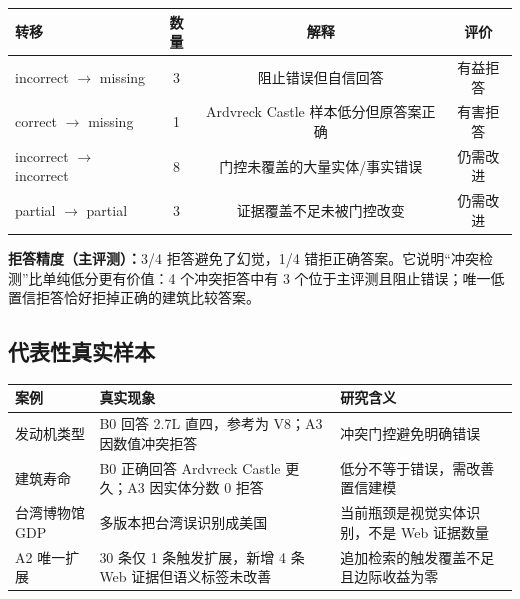 \documentclass[11pt,a4paper,fontset=none]{ctexart}
\begin{document}
\begin{tabularx}{\textwidth}{@{}YCCC@{}}
\toprule
转移 & 数量 & 解释 & 评价 \\
\midrule
incorrect $\rightarrow$ missing & 3 & 阻止错误但自信回答 & 有益拒答 \\
correct $\rightarrow$ missing & 1 & Ardvreck Castle 样本低分但原答案正确 & 有害拒答 \\
incorrect $\rightarrow$ incorrect & 8 & 门控未覆盖的大量实体/事实错误 & 仍需改进 \\
partial $\rightarrow$ partial & 3 & 证据覆盖不足未被门控改变 & 仍需改进 \\
\bottomrule
\end{tabularx}

\begin{resultbox}
\textbf{拒答精度（主评测）：}3/4 拒答避免了幻觉，1/4 错拒正确答案。它说明“冲突检测”比单纯低分更有价值：4 个冲突拒答中有 3 个位于主评测且阻止错误；唯一低置信拒答恰好拒掉正确的建筑比较答案。
\end{resultbox}

\subsection{代表性真实样本}
\begin{tabularx}{\textwidth}{@{}p{2.8cm}YY@{}}
\toprule
案例 & 真实现象 & 研究含义 \\
\midrule
发动机类型 & B0 回答 2.7L 直四，参考为 V8；A3 因数值冲突拒答 & 冲突门控避免明确错误 \\
建筑寿命 & B0 正确回答 Ardvreck Castle 更久；A3 因实体分数 0 拒答 & 低分不等于错误，需改善置信建模 \\
台湾博物馆 GDP & 多版本把台湾误识别成美国 & 当前瓶颈是视觉实体识别，不是 Web 证据数量 \\
A2 唯一扩展 & 30 条仅 1 条触发扩展，新增 4 条 Web 证据但语义标签未改善 & 追加检索的触发覆盖不足且边际收益为零 \\
\bottomrule
\end{tabularx}
\end{document}
